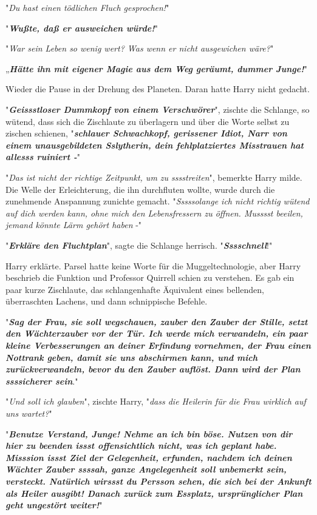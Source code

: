 {"\emph{Du hast einen tödlichen Fluch gesprochen!}"

"\textbf{\emph{Wußte, daß er ausweichen würde!}}"

"\emph{War sein Leben so wenig wert? Was wenn er nicht ausgewichen wäre?}"

„\textbf{\emph{Hätte ihn mit eigener Magie aus dem Weg geräumt, dummer Junge!}}"

Wieder die Pause in der Drehung des Planeten. Daran hatte Harry nicht gedacht.

"\textbf{\emph{Geissstloser Dummkopf von einem Verschwörer}}", zischte die Schlange, so wütend, dass sich die Zischlaute zu überlagern und über die Worte selbst zu zischen schienen, "\textbf{\emph{schlauer Schwachkopf, gerissener Idiot, Narr von einem unausgebildeten Sslytherin, dein fehlplatziertes Misstrauen hat allesss ruiniert -}}"

"\emph{Das ist nicht der richtige Zeitpunkt, um zu sssstreiten}", bemerkte Harry milde.\\ Die Welle der Erleichterung, die ihn durchfluten wollte, wurde durch die zunehmende Anspannung zunichte gemacht. "\emph{Sssssolange ich nicht richtig wütend auf dich werden kann, ohne mich den Lebensfressern zu öffnen. Musssst beeilen, jemand könnte Lärm gehört haben} -"

"\textbf{\emph{Erkläre den Fluchtplan}}", sagte die Schlange herrisch. "\textbf{\emph{Sssschnell}}!"

Harry erklärte. Parsel hatte keine Worte für die Muggeltechnologie, aber Harry beschrieb die Funktion und Professor Quirrell schien zu verstehen. Es gab ein paar kurze Zischlaute, das schlangenhafte Äquivalent eines bellenden, überraschten Lachens, und dann schnippische Befehle.

"\textbf{\emph{Sag der Frau, sie soll wegschauen, zauber den Zauber der Stille, setzt den Wächterzauber vor der Tür. Ich werde mich verwandeln, ein paar kleine Verbesserungen an deiner Erfindung vornehmen, der Frau einen Nottrank geben, damit sie uns abschirmen kann, und mich zurückverwandeln, bevor du den Zauber auflöst. Dann wird der Plan ssssicherer sein}}."

"\emph{Und soll ich glauben}", zischte Harry, "\emph{dass die Heilerin für die Frau wirklich auf uns wartet?}"

"\textbf{\emph{Benutze Verstand, Junge! Nehme an ich bin böse. Nutzen von dir}}\\ \textbf{\emph{hier zu beenden issst offensichtlich nicht, was ich geplant habe.\\ Misssion issst Ziel der Gelegenheit, erfunden, nachdem ich deinen Wächter Zauber ssssah, ganze Angelegenheit soll unbemerkt sein, versteckt. Natürlich wirssst du Persson sehen, die sich bei der Ankunft als Heiler ausgibt! Danach zurück zum Essplatz, ursprünglicher Plan geht ungestört weiter!}}"

}
